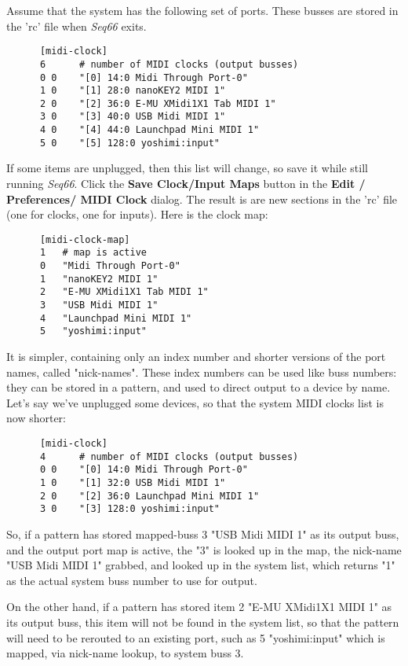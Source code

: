    Assume that the system has the following set of ports.  These busses are
   stored in the 'rc' file when \textsl{Seq66} exits.

   \begin{verbatim}
      [midi-clock]
      6      # number of MIDI clocks (output busses)
      0 0    "[0] 14:0 Midi Through Port-0"
      1 0    "[1] 28:0 nanoKEY2 MIDI 1"
      2 0    "[2] 36:0 E-MU XMidi1X1 Tab MIDI 1"
      3 0    "[3] 40:0 USB Midi MIDI 1"
      4 0    "[4] 44:0 Launchpad Mini MIDI 1"
      5 0    "[5] 128:0 yoshimi:input"
   \end{verbatim}

   If some items are unplugged, then this list will change, so save it while
   still running \textsl{Seq66}.
   Click the
   \textbf{Save Clock/Input Maps} button in the
   \textbf{Edit / Preferences/ MIDI Clock} dialog. 
   The result is are new sections in the 'rc' file (one for clocks, one for
   inputs).  Here is the clock map:

   \begin{verbatim}
      [midi-clock-map]
      1   # map is active
      0   "Midi Through Port-0"
      1   "nanoKEY2 MIDI 1"
      2   "E-MU XMidi1X1 Tab MIDI 1"
      3   "USB Midi MIDI 1"
      4   "Launchpad Mini MIDI 1"
      5   "yoshimi:input"
   \end{verbatim}
   
   It is simpler, containing only an index number and shorter versions of the
   port names, called "nick-names".  These index numbers can be used like buss
   numbers: they can be stored in a pattern, and used to direct output to a
   device by name.  Let's say we've unplugged some devices, so that the system
   MIDI clocks list is now shorter:

   \begin{verbatim}
      [midi-clock]
      4      # number of MIDI clocks (output busses)
      0 0    "[0] 14:0 Midi Through Port-0"
      1 0    "[1] 32:0 USB Midi MIDI 1"
      2 0    "[2] 36:0 Launchpad Mini MIDI 1"
      3 0    "[3] 128:0 yoshimi:input"
   \end{verbatim}

   So, if a pattern has stored mapped-buss 3 "USB Midi MIDI 1"
   as its output buss,
   and the output port map is active, the "3" is looked up in the map, the
   nick-name "USB Midi MIDI 1" grabbed, and looked up in the system list, which
   returns "1" as the actual system buss number to use for output.

   On the other hand, if a pattern has stored item 2 "E-MU XMidi1X1 MIDI 1" as
   its output buss, this item will not be found in the system list, so that the
   pattern will need to be rerouted to an existing port, such as 5
   "yoshimi:input" which is mapped, via nick-name lookup, to system buss 3.

